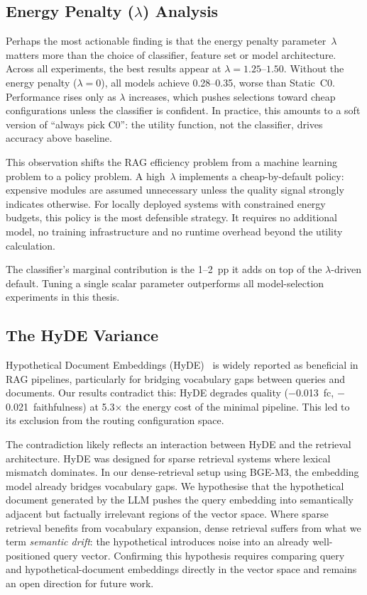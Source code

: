 \subsection{Energy Penalty ($\lambda$) Analysis}
\label{subsec:lambda}

Perhaps the most actionable finding is that the energy penalty
parameter~$\lambda$ matters more than the choice of classifier, feature
set or model architecture.  Across all experiments, the best results
appear at $\lambda = 1.25$--$1.50$.  Without the energy penalty
($\lambda = 0$), all models achieve 0.28--0.35, worse than Static~C0.
Performance rises only as $\lambda$ increases, which pushes selections
toward cheap configurations unless the classifier is confident.  In
practice, this amounts to a soft version of ``always pick C0'': the
utility function, not the classifier, drives accuracy above baseline.

This observation shifts the RAG efficiency problem from a machine learning
problem to a policy problem.  A high~$\lambda$ implements a
cheap-by-default policy: expensive modules are assumed unnecessary unless
the quality signal strongly indicates otherwise.  For locally deployed
systems with constrained energy budgets, this policy is the most
defensible strategy.  It requires no additional model, no training
infrastructure and no runtime overhead beyond the utility calculation.

The classifier's marginal contribution is the 1--2~pp it adds on top of
the $\lambda$-driven default.  Tuning a single scalar parameter
outperforms all model-selection experiments in this thesis.


\subsection{The HyDE Variance}
\label{subsec:hyde}

Hypothetical Document Embeddings (HyDE)~\cite{hyde2023} is widely
reported as beneficial in RAG pipelines, particularly for bridging
vocabulary gaps between queries and documents.  Our results contradict
this: HyDE degrades quality ($-$0.013~fc, $-$0.021~faithfulness) at
5.3$\times$ the energy cost of the minimal pipeline.  This led to its
exclusion from the routing configuration space.

The contradiction likely reflects an interaction between HyDE and the
retrieval architecture.  HyDE was designed for sparse retrieval systems
where lexical mismatch dominates.  In our dense-retrieval setup using
BGE-M3, the embedding model already bridges vocabulary gaps.  We
hypothesise that the hypothetical document generated by the LLM pushes
the query embedding into semantically adjacent but factually irrelevant
regions of the vector space.  Where sparse retrieval benefits from
vocabulary expansion, dense retrieval suffers from what we term
\emph{semantic drift}: the hypothetical introduces noise into an already
well-positioned query vector.  Confirming this hypothesis requires
comparing query and hypothetical-document embeddings directly in the
vector space and remains an open direction for future work.

